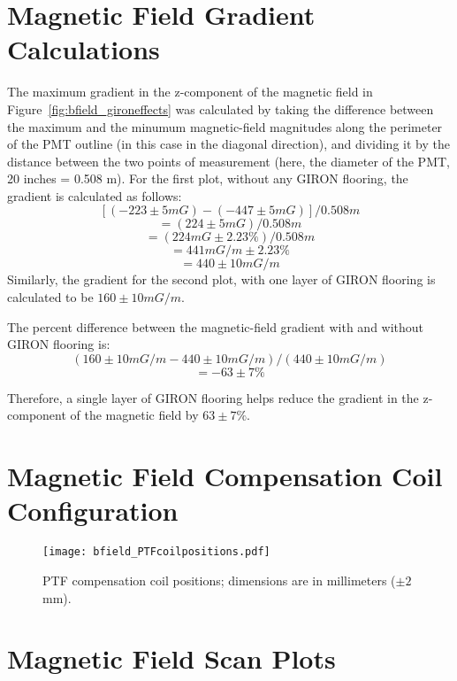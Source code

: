 
\appendix

\section{Magnetic Field Gradient Calculations}
\label{Appendix:MagneticFieldGradientCalculations}

The maximum gradient in the z-component of the magnetic field in Figure~\ref{fig:bfield_gironeffects} was calculated by taking the difference between the maximum and the minumum magnetic-field magnitudes along the perimeter of the PMT outline (in this case in the diagonal direction), and dividing it by the distance between the two points of measurement (here, the diameter of the PMT, 20 inches = 0.508 m).
For the first plot, without any GIRON flooring, the gradient is calculated as follows:
\[[(-223\pm5 mG) - (-447\pm5 mG)]/0.508 m\]
\[=(224\pm5 mG)/0.508 m\]
\[=(224 mG \pm 2.23\%)/0.508 m\]
\[=441 mG/m \pm 2.23\%\]
\[=440 \pm 10 mG/m \]
Similarly, the gradient for the second plot, with one layer of GIRON flooring is calculated to be $ 160 \pm 10 mG/m $.

The percent difference between the magnetic-field gradient with and without GIRON flooring is:
\[(160\pm10 mG/m - 440\pm10 mG/m)/(440\pm10 mG/m)\]
\[=-63\pm7\%\]

Therefore, a single layer of GIRON flooring helps reduce the gradient in the z-component of the magnetic field by $ 63\pm7\% $.

\section{Magnetic Field Compensation Coil Configuration}
\label{Appendix:CoilPositions}
%
\begin{figure}[H]
  \begin{center}
  \texttt{[image: bfield\_PTFcoilpositions.pdf]}
  \caption{PTF compensation coil positions; dimensions are in millimeters ($\pm2$mm).}
  \label{fig:coilpos}
  \end{center}
\end{figure}
%

\newpage

\section{Magnetic Field Scan Plots}
\label{Appendix:MagneticFieldScanPlots}

